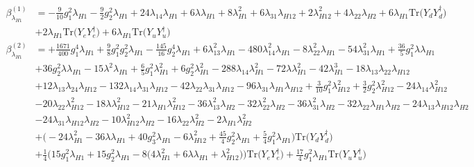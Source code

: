 {\begin{align}
\beta_{\lambda_{H1}}^{(1)} & =  
-\frac{9}{10} g_{1}^{2} \lambda_{H1} -\frac{9}{2} g_{2}^{2} \lambda_{H1} +24 \lambda_{14} \lambda_{H1} +6 \lambda \lambda_{H1} +8 \lambda_{H1}^{2} +6 \lambda_{31} \lambda_{H12} +2 \lambda_{H12}^{2} +4 \lambda_{22} \lambda_{H2} +6 \lambda_{H1} \mbox{Tr}\Big({Y_d  Y_{d}^{\dagger}}\Big) \nonumber \\ 
 &+2 \lambda_{H1} \mbox{Tr}\Big({Y_e  Y_{e}^{\dagger}}\Big) +6 \lambda_{H1} \mbox{Tr}\Big({Y_u  Y_{u}^{\dagger}}\Big) \\ 
\beta_{\lambda_{H1}}^{(2)} & =  
+\frac{1671}{400} g_{1}^{4} \lambda_{H1} +\frac{9}{8} g_{1}^{2} g_{2}^{2} \lambda_{H1} -\frac{145}{16} g_{2}^{4} \lambda_{H1} +6 \lambda_{13}^{2} \lambda_{H1} -480 \lambda_{14}^{2} \lambda_{H1} -8 \lambda_{22}^{2} \lambda_{H1} -54 \lambda_{31}^{2} \lambda_{H1} +\frac{36}{5} g_{1}^{2} \lambda \lambda_{H1} \nonumber \\ 
 &+36 g_{2}^{2} \lambda \lambda_{H1} -15 \lambda^{2} \lambda_{H1} +\frac{6}{5} g_{1}^{2} \lambda_{H1}^{2} +6 g_{2}^{2} \lambda_{H1}^{2} -288 \lambda_{14} \lambda_{H1}^{2} -72 \lambda \lambda_{H1}^{2} -42 \lambda_{H1}^{3} -18 \lambda_{13} \lambda_{22} \lambda_{H12} \nonumber \\ 
 &+12 \lambda_{13} \lambda_{24} \lambda_{H12} -132 \lambda_{14} \lambda_{31} \lambda_{H12} -42 \lambda_{22} \lambda_{31} \lambda_{H12} -96 \lambda_{31} \lambda_{H1} \lambda_{H12} +\frac{3}{10} g_{1}^{2} \lambda_{H12}^{2} +\frac{3}{2} g_{2}^{2} \lambda_{H12}^{2} -24 \lambda_{14} \lambda_{H12}^{2} \nonumber \\ 
 &-20 \lambda_{22} \lambda_{H12}^{2} -18 \lambda \lambda_{H12}^{2} -21 \lambda_{H1} \lambda_{H12}^{2} -36 \lambda_{13}^{2} \lambda_{H2} -32 \lambda_{22}^{2} \lambda_{H2} -36 \lambda_{31}^{2} \lambda_{H2} -32 \lambda_{22} \lambda_{H1} \lambda_{H2} -24 \lambda_{13} \lambda_{H12} \lambda_{H2} \nonumber \\ 
 &-24 \lambda_{31} \lambda_{H12} \lambda_{H2} -10 \lambda_{H12}^{2} \lambda_{H2} -16 \lambda_{22} \lambda_{H2}^{2} -2 \lambda_{H1} \lambda_{H2}^{2} \nonumber \\ 
 &+\Big(-24 \lambda_{H1}^{2}  -36 \lambda \lambda_{H1}  + 40 g_{3}^{2} \lambda_{H1}  -6 \lambda_{H12}^{2}  + \frac{45}{4} g_{2}^{2} \lambda_{H1}  + \frac{5}{4} g_{1}^{2} \lambda_{H1} \Big)\mbox{Tr}\Big({Y_d  Y_{d}^{\dagger}}\Big) \nonumber \\ 
 &+\frac{1}{4} \Big(15 g_{1}^{2} \lambda_{H1}  + 15 g_{2}^{2} \lambda_{H1}  -8 \Big(4 \lambda_{H1}^{2}  + 6 \lambda \lambda_{H1}  + \lambda_{H12}^{2}\Big)\Big)\mbox{Tr}\Big({Y_e  Y_{e}^{\dagger}}\Big) +\frac{17}{4} g_{1}^{2} \lambda_{H1} \mbox{Tr}\Big({Y_u  Y_{u}^{\dagger}}\Big) \nonumber \\ 

\end{align}}
